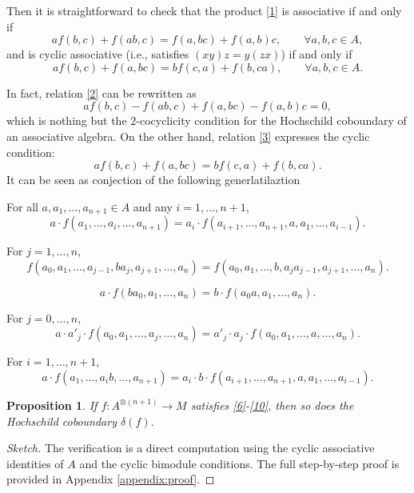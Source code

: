 \documentclass[pdflatex,sn-mathphys-num]{sn-jnl}%
\theoremstyle{thmstyleone}%
\newtheorem{proposition}[theorem]{Proposition}%
\theoremstyle{thmstyletwo}%
\theoremstyle{thmstylethree}%
\begin{document}
Then it is straightforward to check that the product \ref{1} is associative if and only if
\begin{equation}\label{2}
a f(b, c) + f(a b, c) = f(a, b c) + f(a, b) c, \qquad \forall a, b, c \in A,
\end{equation}
and is cyclic associative (i.e., satisfies $(xy)z = y(zx)$) if and only if
\begin{equation}\label{3}
a f(b, c) + f(a, b c) = b f(c, a) + f(b, c a), \qquad \forall a, b, c \in A. 
\end{equation}

In fact, relation \ref{2} can be rewritten as
\[
a f(b, c) - f(ab,c) + f(a,bc) - f(a, b) c = 0,
\]
which is nothing but the $2$-cocyclicity condition for the Hochschild coboundary of an associative algebra. On the other hand, relation \ref{3} expresses the cyclic condition:
\[
a f(b, c) + f(a, bc) = b f(c, a) + f(b, ca).
\]
It can be seen as conjection of the following generlatilaztion 



For all $a, a_1, \ldots, a_{n+1} \in A$ and any $i = 1, \ldots, n+1$,
\begin{equation}\label{6}
a \cdot f(a_1, \ldots, a_i, \ldots, a_{n+1}) = a_i \cdot f(a_{i+1}, \ldots, a_{n+1},a, a_1, \ldots, a_{i-1}). 
\end{equation}


For $j = 1, \ldots, n$,
\begin{equation}\label{7}
f(a_0, a_1, \ldots, a_{j-1}, b a_j, a_{j+1}, \ldots, a_n) = f(a_0, a_1, \ldots, b, a_j a_{j-1}, a_{j+1}, \ldots, a_n). 
\end{equation}

\begin{equation}\label{8}
a \cdot f(b a_0, a_1, \ldots, a_n) = b \cdot f(a_0 a, a_1, \ldots, a_n). 
\end{equation}

For $j = 0, \ldots, n$,
\begin{equation}\label{9}
a \cdot a'_j \cdot f(a_0, a_1, \ldots, a_j, \ldots, a_n) = a'_j \cdot a_j \cdot f(a_0, a_1, \ldots, a, \ldots, a_n). 
\end{equation}


For $i = 1, \ldots, n+1$,
\begin{equation}\label{10}
a \cdot f(a_1, \ldots, a_i b, \ldots, a_{n+1}) = a_i\cdot b  \cdot f(a_{i+1}, \ldots, a_{n+1},a, a_1, \ldots, a_{i-1}). 
\end{equation}
\begin{proposition}\label{prop:cohomology_preserved}
If $f: A^{\otimes (n+1)} \to M$ satisfies \ref{6}-\ref{10}, then so does the Hochschild coboundary $\delta(f)$.
\end{proposition}
\begin{proof}[Sketch]
The verification is a direct computation using the cyclic associative identities of $A$ and the cyclic bimodule conditions. The full step-by-step proof is provided in Appendix \ref{appendix:proof}.
\end{proof}
\end{document}
